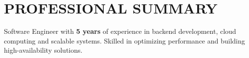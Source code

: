 \section{PROFESSIONAL SUMMARY}
\begin{onecolentry}
    Software Engineer with \textbf{5 years} of experience in backend development, cloud computing and scalable systems. Skilled in optimizing performance and building high-availability solutions.
\end{onecolentry}
